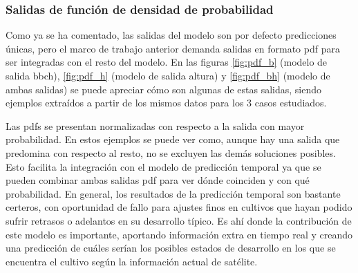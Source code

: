 \subsubsection{Salidas de función de densidad de probabilidad}
Como ya se ha comentado, las salidas del modelo son por defecto predicciones únicas, pero el marco de trabajo anterior demanda salidas en formato \gls{pdf} para ser integradas con el resto del modelo. En las figuras \ref{fig:pdf_b} (modelo de salida \gls{bbch}), \ref{fig:pdf_h} (modelo de salida altura) y \ref{fig:pdf_bh} (modelo de ambas salidas) se puede apreciar cómo son algunas de estas salidas, siendo ejemplos extraídos a partir de los mismos datos para los 3 casos estudiados. 
\\
\par Las \gls{pdf}s se presentan normalizadas con respecto a la salida con mayor probabilidad. En estos ejemplos se puede ver como, aunque hay una salida que predomina con respecto al resto, no se excluyen las demás soluciones posibles. Esto facilita la integración con el modelo de predicción temporal ya que se pueden combinar ambas salidas \gls{pdf} para ver dónde coinciden y con qué probabilidad. En general, los resultados de la predicción temporal son bastante certeros, con oportunidad de fallo para ajustes finos en cultivos que hayan podido sufrir retrasos o adelantos en su desarrollo típico. Es ahí donde la contribución de este modelo es importante, aportando información extra en tiempo real y creando una predicción de cuáles serían los posibles estados de desarrollo en los que se encuentra el cultivo según la información actual de satélite. 
\\
